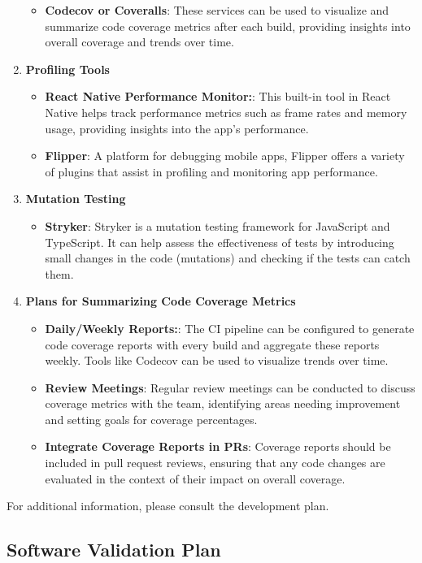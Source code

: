 \documentclass[12pt, titlepage]{article}
\begin{document}
\begin{enumerate}
\begin{itemize}
		\item \textbf{Codecov or Coveralls}: These services can be used to visualize and summarize code coverage metrics after each build, providing insights into overall coverage and trends over time.
	\end{itemize}
	\item \textbf{Profiling Tools}
	\begin{itemize}
		\item \textbf{React Native Performance Monitor:}: This built-in tool in React Native helps track performance metrics such as frame rates and memory usage, providing insights into the app's performance.
		\item \textbf{Flipper}: A platform for debugging mobile apps, Flipper offers a variety of plugins that assist in profiling and monitoring app performance.
	\end{itemize}
	\item \textbf{Mutation Testing}
	\begin{itemize}
		\item \textbf{Stryker}: Stryker is a mutation testing framework for JavaScript and TypeScript. It can help assess the effectiveness of tests by introducing small changes in the code (mutations) and checking if the tests can catch them.
	\end{itemize}
	\item \textbf{Plans for Summarizing Code Coverage Metrics}
	\begin{itemize}
		\item \textbf{Daily/Weekly Reports:}: The CI pipeline can be configured to generate code coverage reports with every build and aggregate these reports weekly. Tools like Codecov can be used to visualize trends over time.
		\item \textbf{Review Meetings}: Regular review meetings can be conducted to discuss coverage metrics with the team, identifying areas needing improvement and setting goals for coverage percentages.
		\item \textbf{Integrate Coverage Reports in PRs}: Coverage reports should be included in pull request reviews, ensuring that any code changes are evaluated in the context of their impact on overall coverage.
	\end{itemize}
\end{enumerate}

\noindent For additional information, please consult the development plan.
\subsection{Software Validation Plan}
\end{document}
